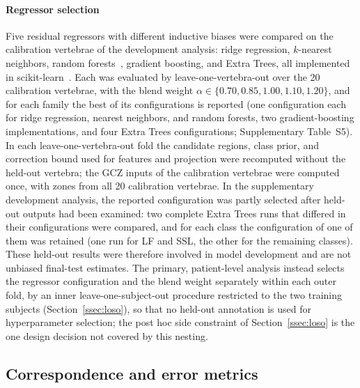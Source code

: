 \documentclass[5p,times,twocolumn,authoryear]{elsarticle}
\begin{document}
\paragraph{Regressor selection} Five residual regressors with different inductive biases were compared on the calibration vertebrae of the development analysis: ridge regression, $k$-nearest neighbors, random forests~\citep{breiman2001}, gradient boosting, and Extra Trees, all implemented in scikit-learn~\citep{pedregosa2011}. Each was evaluated by leave-one-vertebra-out over the 20 calibration vertebrae, with the blend weight $\alpha \in \{0.70, 0.85, 1.00, 1.10, 1.20\}$, and for each family the best of its configurations is reported (one configuration each for ridge regression, nearest neighbors, and random forests, two gradient-boosting implementations, and four Extra Trees configurations; Supplementary Table~S5). In each leave-one-vertebra-out fold the candidate regions, class prior, and correction bound used for features and projection were recomputed without the held-out vertebra; the GCZ inputs of the calibration vertebrae were computed once, with zones from all 20 calibration vertebrae. In the supplementary development analysis, the reported configuration was partly selected after held-out outputs had been examined: two complete Extra Trees runs that differed in their configurations were compared, and for each class the configuration of one of them was retained (one run for LF and SSL, the other for the remaining classes). These held-out results were therefore involved in model development and are not unbiased final-test estimates. The primary, patient-level analysis instead selects the regressor configuration and the blend weight separately within each outer fold, by an inner leave-one-subject-out procedure restricted to the two training subjects (Section~\ref{ssec:loso}), so that no held-out annotation is used for hyperparameter selection; the post hoc side constraint of Section~\ref{ssec:loso} is the one design decision not covered by this nesting.

\subsection{Correspondence and error metrics}
\label{ssec:correspondence}
\end{document}
